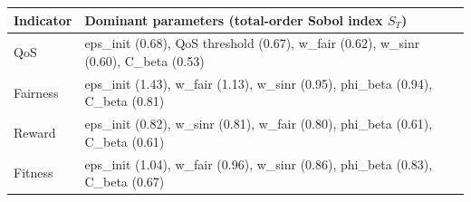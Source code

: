 \begin{tabular}{ll}
\hline
\textbf{Indicator} & \textbf{Dominant parameters (total-order Sobol index $S_T$)} \\
\hline
QoS & eps\_init (0.68), QoS threshold (0.67), w\_fair (0.62), w\_sinr (0.60), C\_beta (0.53) \\
Fairness & eps\_init (1.43), w\_fair (1.13), w\_sinr (0.95), phi\_beta (0.94), C\_beta (0.81) \\
Reward & eps\_init (0.82), w\_sinr (0.81), w\_fair (0.80), phi\_beta (0.61), C\_beta (0.61) \\
Fitness & eps\_init (1.04), w\_fair (0.96), w\_sinr (0.86), phi\_beta (0.83), C\_beta (0.67) \\
\hline
\end{tabular}